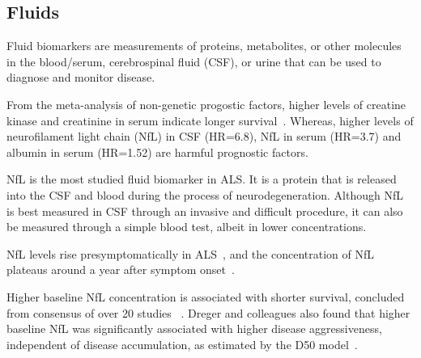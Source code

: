 \subsection{Fluids}

Fluid biomarkers are measurements of proteins, metabolites, or other molecules in the blood/serum, cerebrospinal fluid (CSF), or urine that can be used to diagnose and monitor disease.

From the meta-analysis of non-genetic progostic factors, higher levels of creatine kinase and creatinine in serum indicate longer survival~\cite{suPredictorsSurvivalPatients2021}.
Whereas, higher levels of neurofilament light chain (NfL) in CSF (HR=6.8), NfL in serum (HR=3.7) and albumin in serum (HR=1.52) are harmful prognostic factors.

NfL is the most studied fluid biomarker in ALS.
It is a protein that is released into the CSF and blood during the process of neurodegeneration.
Although NfL is best measured in CSF through an invasive and difficult procedure, it can also be measured through a simple blood test, albeit in lower concentrations.

NfL levels rise presymptomatically in ALS~\cite{benatarValidationSerumNeurofilaments2020}, and the concentration of NfL plateaus around a year after symptom onset~\cite{benatarNeurofilamentsPresymptomaticALS2019, benatarValidationSerumNeurofilaments2020, thompsonMulticentreAppraisalAmyotrophic2022}.

Higher baseline NfL concentration is associated with shorter survival, concluded from consensus of over 20 studies ~\cite{irwinFluidBiomarkersAmyotrophic2024}.
Dreger and colleagues also found that higher baseline NfL was significantly associated with higher disease aggressiveness, independent of disease accumulation, as estimated by the D50 model~\cite{dregerCerebrospinalFluidNeurofilament2021}.


